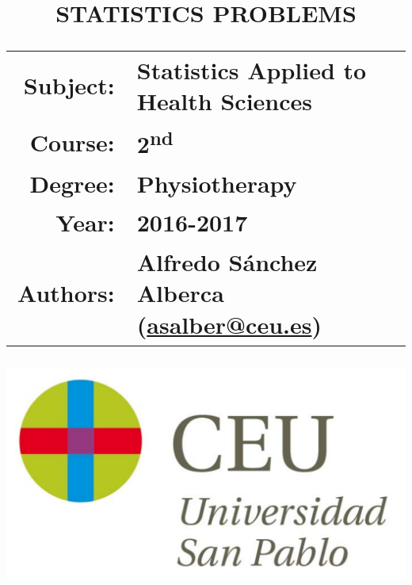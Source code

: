\documentclass[a4paper,titlepage]{article}
\begin{document}
\sloppy

\title{\vskip 2cm
\Huge \textbf{\textsf{\quad \textcolor{blueceu}{STATISTICS PROBLEMS}\quad}}\\
   \vskip 1cm
\Large \sffamily
\begin{tabular}{rl}
\textcolor{blueceu}{Subject:} & Statistics Applied to Health Sciences\\
\textcolor{blueceu}{Course:} & 2\textsuperscript{nd}\\
\textcolor{blueceu}{Degree:} &  Physiotherapy\\
\textcolor{blueceu}{Year:} & 2016-2017\\
\textcolor{blueceu}{Authors:} 
& Alfredo S\'anchez Alberca (\url{asalber@ceu.es})
\end{tabular}
}

\author{}
\date{\includegraphics[scale=0.3]{img/logo_uspceu}}

\maketitle
\newpage
\tableofcontents
\newpage






% 
\end{document}
